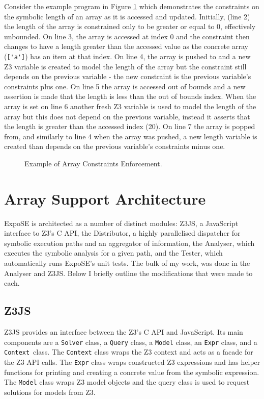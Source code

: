 \documentclass[]{final_report}
\begin{document}
Consider the example program in Figure \ref{fig:expose-array-length} which demonstrates the constraints on the symbolic length of an array as it is accessed and updated. Initially, (line 2) the length of the array is constrained only to be greater or equal to 0, effectively unbounded. On line 3, the array is accessed at index 0 and the constraint then changes to have a length greater than the accessed value as the concrete array (\lstinline|['a']|) has an item at that index. On line 4, the array is pushed to and a new Z3 variable is created to model the length of the array but the constraint still depends on the previous variable - the new constraint is the previous variable's constraints plus one. On line 5 the array is accessed out of bounds and a new assertion is made that the length is less than the out of bounds index. When the array is set on line 6 another fresh Z3 variable is used to model the length of the array but this does not depend on the previous variable, instead it asserts that the length is greater than the accessed index (20). On line 7 the array is popped from, and similarly to line 4 when the array was pushed, a new length variable is created than depends on the previous variable's constraints minus one.

\begin{figure}[t]

\caption{\label{fig:expose-array-length} Example of Array Constraints Enforcement.}
\end{figure}

\section{Array Support Architecture}
ExpoSE is architected as a number of distinct modules: Z3JS, a JavaScript interface to Z3’s C API, the Distributor, a highly parallelised dispatcher for symbolic execution paths and an aggregator of information, the Analyser, which executes the symbolic analysis for a given path, and the Tester, which automatically runs ExpoSE’s unit tests. The bulk of my work, was done in the Analyser and Z3JS. Below I briefly outline the modifications that were made to each.

\subsection{Z3JS}
Z3JS provides an interface between the Z3’s C API and JavaScript. Its main components are a \lstinline|Solver| class, a \lstinline|Query| class, a \lstinline|Model| class, an \lstinline|Expr| class, and a \lstinline|Context|~class. The \lstinline|Context| class wraps the Z3 context and acts as a facade for the Z3 API calls. The \lstinline|Expr| class wraps constructed Z3 expressions and has helper functions for printing and creating a concrete value from the symbolic expression. The \lstinline|Model| class wraps Z3 model objects and the query class is used to request solutions for models from Z3.
\end{document}
